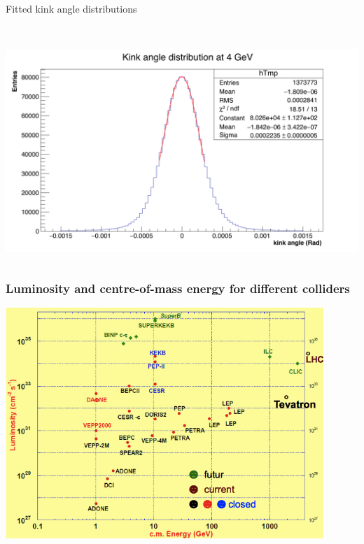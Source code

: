 \documentclass{beamer}
\begin{document}
\begin{frame}[plain]
\begin{block}{Fitted kink angle distributions}
\begin{columns}[c]
\begin{column}{5cm}
          \ 
          \includegraphics[width = \textwidth]{Pictures/kinkAngle4GeV.png}
        \end{column} 
      \end{columns}
    \end{block}
  \end{frame}



  \begin{frame}[plain]
    \frametitle{Luminosity and centre-of-mass energy for different colliders}

    \begin{center}
      \includegraphics[width = 0.9\textwidth]{Pictures/colliders_ee-pp.png}
    \end{center}
  \end{frame}

  
\end{document}
